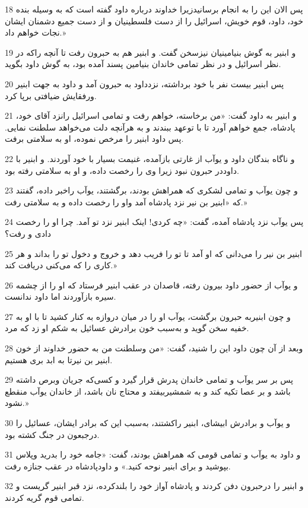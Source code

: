 \par 18 پس الان این را به انجام برسانیدزیرا خداوند درباره داود گفته است که به وسیله بنده خود، داود، قوم خویش، اسرائیل را از دست فلسطینیان و از دست جمیع دشمنان ایشان نجات خواهم داد.»
\par 19 و ابنیر به گوش بنیامینیان نیزسخن گفت. و ابنیر هم به حبرون رفت تا آنچه راکه در نظر اسرائیل و در نظر تمامی خاندان بنیامین پسند آمده بود، به گوش داود بگوید.
\par 20 پس ابنیر بیست نفر با خود برداشته، نزدداود به حبرون آمد و داود به جهت ابنیر ورفقایش ضیافتی برپا کرد.
\par 21 و ابنیر به داود گفت: «من برخاسته، خواهم رفت و تمامی اسرائیل رانزد آقای خود، پادشاه، جمع خواهم آورد تا با توعهد ببندند و به هر‌آنچه دلت می‌خواهد سلطنت نمایی. پس داود ابنیر را مرخص نموده، او به سلامتی برفت.
\par 22 و ناگاه بندگان داود و یوآب از غارتی بازآمده، غنیمت بسیار با خود آوردند. و ابنیر با داوددر حبرون نبود زیرا وی را رخصت داده، و او به سلامتی رفته بود.
\par 23 و چون یوآب و تمامی لشکری که همراهش بودند، برگشتند، یوآب راخبر داده، گفتند که «ابنیر بن نیر نزد پادشاه آمد واو را رخصت داده و به سلامتی رفت.»
\par 24 پس یوآب نزد پادشاه آمده، گفت: «چه کردی! اینک ابنیر نزد تو آمد. چرا او را رخصت دادی و رفت؟ 
\par 25 ابنیر بن نیر را می‌دانی که او آمد تا تو را فریب دهد و خروج و دخول تو را بداند و هر کاری را که می‌کنی دریافت کند.»
\par 26 و یوآب از حضور داود بیرون رفته، قاصدان در عقب ابنیر فرستاد که او را از چشمه سیره بازآوردند اما داود ندانست.
\par 27 و چون ابنیربه حبرون برگشت، یوآب او را در میان دروازه به کنار کشید تا با او به خفیه سخن گوید و به‌سبب خون برادرش عسائیل به شکم او زد که مرد.
\par 28 وبعد از آن چون داود این را شنید، گفت: «من وسلطنت من به حضور خداوند از خون ابنیر بن نیرتا به ابد بری هستیم.
\par 29 پس بر سر یوآب و تمامی خاندان پدرش قرار گیرد و کسی‌که جریان وبرص داشته باشد و بر عصا تکیه کند و به شمشیربیفتد و محتاج نان باشد، از خاندان یوآب منقطع نشود.»
\par 30 و یوآب و برادرش ابیشای، ابنیر راکشتند، به‌سبب این که برادر ایشان، عسائیل را درجبعون در جنگ کشته بود.
\par 31 و داود به یوآب و تمامی قومی که همراهش بودند، گفت: «جامه خود را بدرید وپلاس بپوشید و برای ابنیر نوحه کنید.» و داودپادشاه در عقب جنازه رفت.
\par 32 و ابنیر را درحبرون دفن کردند و پادشاه آواز خود را بلندکرده، نزد قبر ابنیر گریست و تمامی قوم گریه کردند.
